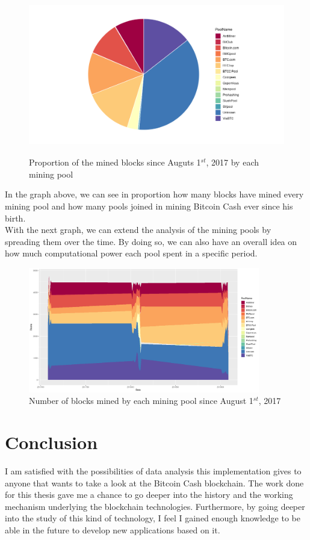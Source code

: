 \begin{figure}[h]
    \centering
    \includegraphics[height = 7cm]{poolminers.png}
    \caption{Proportion of the mined blocks since Auguts 1$^{st}$, 2017 by each mining pool}
    \label{fig:request}
\end{figure}

In the graph above, we can see in proportion how many blocks have mined every mining pool and
how many pools joined in mining Bitcoin Cash ever since his birth.\\
With the next graph, we can extend the analysis of the mining pools by spreading them over the time.
By doing so, we can also have an overall idea on how much computational power each pool spent 
in a specific period.

\begin{figure}[h]
    \centering
    \includegraphics[width = 0.9\textwidth]{stackblocks.png}
    \caption{Number of blocks mined by each mining pool since August 1$^{st}$, 2017}
    \label{fig:request}
\end{figure}

\section{Conclusion}
I am satisfied with the possibilities of data analysis this implementation gives to
anyone that wants to take a look at the Bitcoin Cash blockchain.
The work done for this thesis gave me a chance to go deeper into the history and the 
working mechanism underlying the blockchain technologies. Furthermore, by going 
deeper into the study of this kind of technology, I feel I gained enough knowledge 
to be able in the future to develop new applications based on it.

